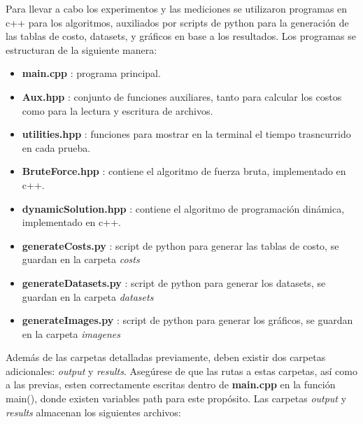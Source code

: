 Para llevar a cabo los experimentos y las mediciones se utilizaron programas en c++ para los algoritmos, auxiliados por scripts de python para la generación de las tablas de costo, 
datasets, y gráficos en base a los resultados. Los programas se estructuran de la siguiente manera:

\begin{itemize}
    \item \textbf{main.cpp} : programa principal.
    \item \textbf{Aux.hpp} : conjunto de funciones auxiliares, tanto para calcular los costos como para la lectura y escritura de archivos.
    \item \textbf{utilities.hpp} : funciones para mostrar en la terminal el tiempo trasncurrido en cada prueba.
    \item \textbf{BruteForce.hpp} : contiene el algoritmo de fuerza bruta, implementado en c++.
    \item \textbf{dynamicSolution.hpp} : contiene el algoritmo de programación dinámica, implementado en c++.
    \item \textbf{generateCosts.py} : script de python para generar las tablas de costo, se guardan en la carpeta \textit{costs}
    \item \textbf{generateDatasets.py} : script de python para generar los datasets, se guardan en la carpeta \textit{datasets}
    \item \textbf{generateImages.py} : script de python para generar los gráficos, se guardan en la carpeta \textit{imagenes}
\end{itemize}

Además de las carpetas detalladas previamente, deben existir dos carpetas adicionales: \textit{output} y \textit{results}. Asegúrese de que las rutas a 
estas carpetas, así como a las previas, esten correctamente escritas dentro de \textbf{main.cpp} en la función main(), donde existen variables path para 
este propósito. Las carpetas \textit{output} y \textit{results} almacenan los siguientes archivos:

